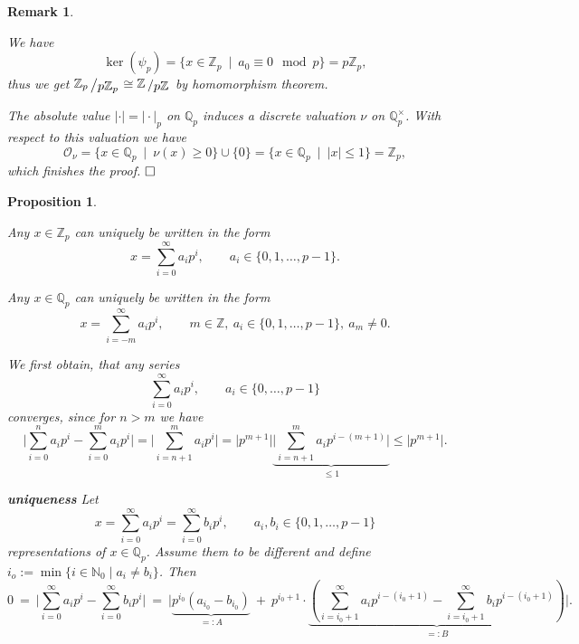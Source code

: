 \documentclass[11pt]{book}
\newtheorem{proposition}[theorem]{Proposition}
\newtheorem{remark}[theorem]{Remark}
\theoremstyle{nonumberbreak}
\newenvironment{pr}[1][]{\ifthenelse{\equal{#1}{}}{\proof}{\proof[#1]}\rm}{\endproof}
\newcommand{\slant}[2]{{\raisebox{.1em}{$#1$}\left/\raisebox{-.1em}{$#2$}\right.}}
\begin{document}
\begin{spacing}{1.3}
\begin{remark}
\begin{pr}
\begin{compactenum}
We have
$$\ker(\psi_p)=\{x \in \mathbb{Z}_p  \ \mid \ a_0 \equiv 0 \mod p\}=p\mathbb{Z}_p,$$
thus we get
$\slant{\mathbb{Z}_p}{p\mathbb{Z}_p} \cong \slant{\mathbb{Z}}{p\mathbb{Z}}$ by homomorphism theorem.
\item The absolute value $\vert \cdot \vert=\vert \cdot \vert_p$ on $\mathbb{Q}_p$ induces a discrete valuation $\nu$ on $\mathbb{Q}_p^{\times}$. With respect to this valuation we have
$$\mathcal{O}_{\nu}=\{x \in \mathbb{Q}_p \ \mid \ \nu(x) \geqslant 0\} \cup \{0\} = \{x \in \mathbb{Q}_p \ \mid \ |x|\leqslant 1 \} = \mathbb{Z}_p,$$
which finishes the proof. $\hfill \Box$
\end{compactenum}
\end{pr}
\end{remark}

\begin{proposition}%
\begin{compactenum}
\item Any $x \in \mathbb{Z}_p$ can uniquely be written in the form 
$$x= \sum_{i=0}^{\infty} a_i p^{i}, \qquad a_i \in \{0,1, \ldots, p-1\}.$$
\item Any $x \in \mathbb{Q}_p$ can uniquely be written in the form 
$$x=\sum_{i=-m}^{\infty} a_i p^{i}, \qquad m \in \mathbb{Z}, \ a_i \in \{0,1, \ldots, p-1\},\ a_m\neq0.$$
\end{compactenum}
\begin{pr}
\begin{compactenum}
\item We first obtain, that any series
$$\sum_{i=0}^{\infty}a_i p^{i}, \qquad a_i \in \{0, \ldots, p-1\}$$
converges, since for $n>m$ we have
$$\bigg\vert \sum_{i=0}^n a_i p^{i}-\sum_{i=0}^m a_ip^{i} \bigg\vert = \bigg\vert\sum_{i=n+1}^m a_ip^{i} \bigg\vert = \big\vert p^{m+1}\big\vert \underbrace{\bigg\vert \sum_{i=n+1}^m a_i p^{i-(m+1)} \bigg\vert}_{\leqslant 1} \leqslant \big\vert p^{m+1} \big\vert.$$
\begin{compactenum}
\item[\textbf{uniqueness}] Let
$$x=\sum_{i=0}^{\infty} a_i p^{i} = \sum_{i=0}^{\infty} b_i p^{i}, \qquad a_i, b_i \in \{0,1, \ldots, p-1\}$$
representations of $x \in \mathbb{Q}_p$. Assume them to be different and define $i_o:= \min\{i \in \mathbb{N}_0 \mid a_i \neq b_i\}$. Then 
$$0 \ = \ \bigg\vert \sum_{i=0}^{\infty} a_i p^{i} - \sum_{i=0}^{\infty} b_i p^{i} \bigg\vert \ =\ \Bigg\vert \underbrace{p^{i_0} (a_{i_0}-b_{i_0})}_{=:A} \ + \ p^{i_0+1} \cdot \underbrace{\left(\sum_{i=i_0+1}^{\infty} a_i p^{i-(i_0+1)} - \sum_{i=i_0+1}^{\infty} b_i p^{i-(i_0+1)} \right)}_{=:B}\Bigg\vert. $$

\end{compactenum}
\end{compactenum}
\end{pr}
\end{proposition}
\end{spacing}
\end{document}
